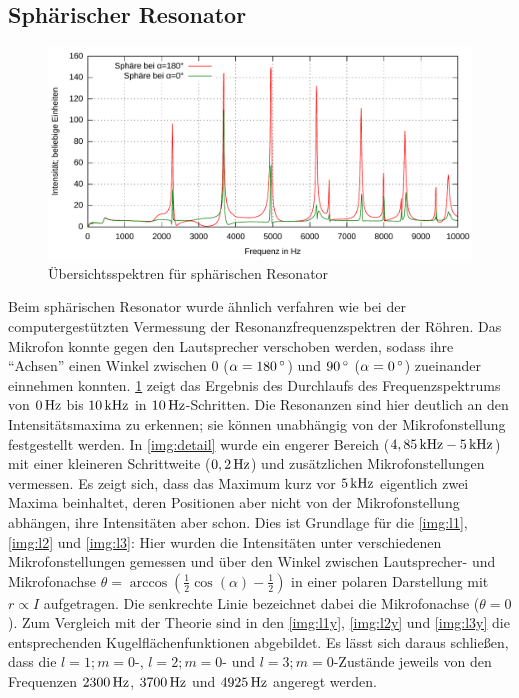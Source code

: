 \documentclass[numbers=noenddot,12pt,a4paper]{scrartcl}
\newcommand{\degree}{^\circ}
\begin{document}
\subsection{Sphärischer Resonator}
\begin{figure}[H]
	\includegraphics[width=\textwidth]{messwerte/sphaeren0-10kHz.pdf}
	\caption{Übersichtsspektren für sphärischen Resonator}\label{img:ubersicht}
\end{figure}
Beim sphärischen Resonator wurde ähnlich verfahren wie bei der computergestützten Vermessung der Resonanzfrequenzspektren der Röhren. Das Mikrofon konnte gegen den Lautsprecher verschoben werden, sodass ihre "`Achsen"' einen Winkel zwischen $0$ ($\alpha=\unit[180]{\degree}$) und $\unit[90]{\degree}$ ($\alpha=\unit[0]{\degree}$) zueinander einnehmen konnten. \ref{img:ubersicht} zeigt das Ergebnis des Durchlaufs des Frequenzspektrums von $\unit[0]{Hz}$ bis $\unit[10]{kHz}$ in $\unit[10]{Hz}$-Schritten. Die Resonanzen sind hier deutlich an den Intensitätsmaxima zu erkennen; sie können unabhängig von der Mikrofonstellung festgestellt werden. In \ref{img:detail} wurde ein engerer Bereich ($\unit[4,85]{kHz}-\unit[5]{kHz}$) mit einer kleineren Schrittweite ($\unit[0,2]{Hz}$) und zusätzlichen Mikrofonstellungen vermessen. Es zeigt sich, dass das Maximum kurz vor $\unit[5]{kHz}$ eigentlich zwei Maxima beinhaltet, deren Positionen aber nicht von der Mikrofonstellung abhängen, ihre Intensitäten aber schon. Dies ist Grundlage für die \ref{img:l1}, \ref{img:l2} und \ref{img:l3}: Hier wurden die Intensitäten unter verschiedenen Mikrofonstellungen gemessen und über den Winkel zwischen Lautsprecher- und Mikrofonachse $\theta=\arccos\left(\frac{1}{2}\cos\left(\alpha\right)-\frac{1}{2}\right)$ in einer polaren Darstellung mit $r\propto I$ aufgetragen. Die senkrechte Linie bezeichnet dabei die Mikrofonachse ($\theta=0$). Zum Vergleich mit der Theorie sind in den \ref{img:l1y}, \ref{img:l2y} und \ref{img:l3y} die entsprechenden Kugelflächenfunktionen abgebildet. Es lässt sich daraus schließen, dass die $l=1;m=0$-, $l=2;m=0$- und $l=3;m=0$-Zustände jeweils von den Frequenzen $\unit[2300]{Hz}$, $\unit[3700]{Hz}$ und $\unit[4925]{Hz}$ angeregt werden.
\end{document}
